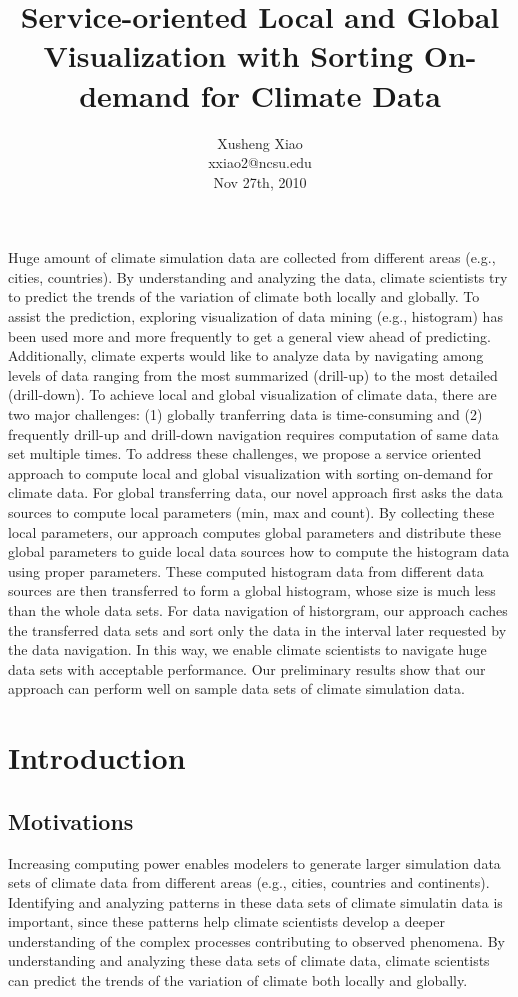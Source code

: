 \documentclass[times, 10pt,onecolumn]{article} %
\title{Service-oriented Local and Global Visualization with Sorting On-demand for Climate Data}
\author{
Xusheng Xiao\\
\small{xxiao2@ncsu.edu}\\
\small{Nov 27th, 2010}
}
\begin{document}
\maketitle
\abstract
Huge amount of climate simulation data are collected from different areas (e.g., cities, countries). By understanding and analyzing the data, climate scientists try to predict the trends of the variation of climate both locally and globally. To assist the prediction, exploring visualization of data mining (e.g., histogram) has been used more and more frequently to get a general view ahead of predicting. Additionally, climate experts would like to analyze data by navigating among levels of data ranging from the most summarized (drill-up) to the most detailed (drill-down). To achieve local and global visualization of climate data, there are two major challenges: (1) globally tranferring data is time-consuming and (2) frequently drill-up and drill-down navigation requires computation of same data set multiple times. To address these challenges, we propose a service oriented approach to compute local and global visualization with sorting on-demand for climate data. For global transferring data, our novel approach first asks the data sources to compute local parameters (min, max and count). By collecting these local parameters, our approach computes global parameters and distribute these global parameters to guide local data sources how to compute the histogram data using proper parameters. These computed histogram data from different data sources are then transferred to form a global histogram, whose size is much less than the whole data sets. For data navigation of historgram, our approach caches the transferred data sets and sort only the data in the interval later requested by the data navigation. In this way, we enable climate scientists to navigate huge data sets with acceptable performance. Our preliminary results show that our approach can perform well on sample data sets of climate simulation data.  

\section{Introduction}
\subsection{Motivations} 
Increasing computing power enables modelers to generate larger simulation data sets of climate data from different areas (e.g., cities, countries and continents). Identifying and analyzing patterns in these data sets of climate simulatin data is important, since these patterns help climate scientists develop a deeper understanding of the complex processes contributing to observed phenomena. By understanding and analyzing these data sets of climate data, climate scientists can predict the trends of the variation of climate both locally and globally. 
\end{document}
